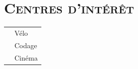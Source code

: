 \documentclass[oneside]{article}
\begin{document}
{\begin{minipage}[t][\textheight-2\fboxsep-2\fboxrule][t]{\dimexpr0.40\textwidth-2\fboxrule-2\fboxsep\relax}
    \section*{\scshape \Large Centres d'intérêt}
    \begin{tabularx}{\textwidth}{cY}
      \faBicycle{}    & Vélo \\
      \faLaptopCode{} & Codage \\
      \faFilm{}       & Cinéma \\
    \end{tabularx}
    \vspace{.3cm} \\
  \end{minipage}
}
\hfill
\end{document}
